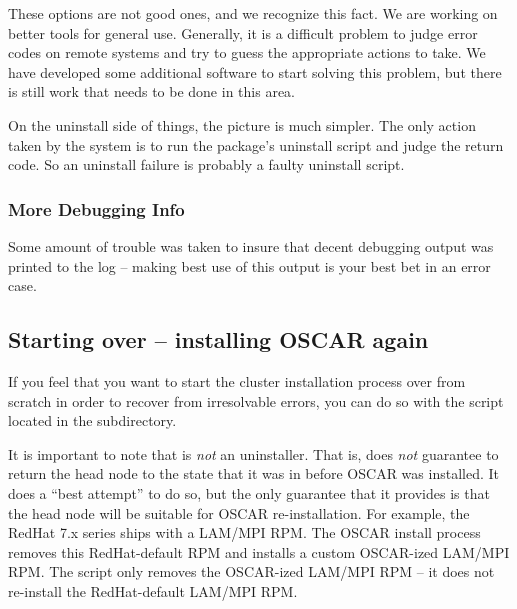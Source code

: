 These options are not good ones, and we recognize this fact.  We are working
on better tools for general use.  Generally, it is a difficult problem to
judge error codes on remote systems and try to guess the appropriate actions
to take.  We have developed some additional software to start solving this
problem, but there is still work that needs to be done in this area.

On the uninstall side of things, the picture is much simpler.  The only
action taken by the system is to run the package's uninstall script and
judge the return code.  So an uninstall failure is probably a faulty
uninstall script.


\subsubsection{More Debugging Info}
\label{det:more-debug-info}

Some amount of trouble was taken to insure that decent debugging output
was printed to the log -- making best use of this output is your best bet
in an error case.

\endchange 

\subsection{Starting over -- installing OSCAR again}

If you feel that you want to start the cluster installation process
over from scratch in order to recover from irresolvable errors, you
can do so with the  script located in the
 subdirectory.

It is important to note that  is {\em not} an
uninstaller.  That is,  does {\em not} guarantee to
return the head node to the state that it was in before OSCAR was
installed.  It does a ``best attempt'' to do so, but the only
guarantee that it provides is that the head node will be suitable for
OSCAR re-installation.  For example, the RedHat 7.x series ships with
a LAM/MPI RPM.  The OSCAR install process removes this RedHat-default
RPM and installs a custom OSCAR-ized LAM/MPI RPM.  The
 script only removes the OSCAR-ized LAM/MPI RPM -- it
does not re-install the RedHat-default LAM/MPI RPM.

